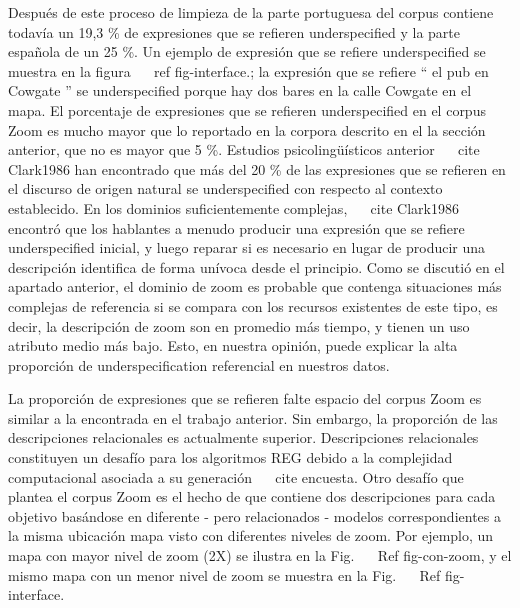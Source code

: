 Despu\'es de este proceso de limpieza de la parte portuguesa del corpus contiene todav\'{i}a un 19,3 \% de expresiones que se refieren underspecified y la parte espa\~nola de un 25 \%. Un ejemplo de expresi\'on que se refiere underspecified se muestra en la figura ~ \ ref {fig-interface}.; la expresi\'on que se refiere `` el pub en Cowgate '' se underspecified porque hay dos bares en la calle Cowgate en el mapa. El porcentaje de expresiones que se refieren underspecified en el corpus Zoom es mucho mayor que lo reportado en la corpora descrito en el la secci\'on anterior, que no es mayor que 5 \%. Estudios psicoling\"u\'{i}sticos anterior ~ \ cite {} Clark1986 han encontrado que m\'as del 20 \% de las expresiones que se refieren en el discurso de origen natural se underspecified con respecto al contexto establecido. En los dominios suficientemente complejas, ~ \ cite {} Clark1986 encontr\'o que los hablantes a menudo producir una expresi\'on que se refiere underspecified inicial, y luego reparar si es necesario en lugar de producir una descripci\'on identifica de forma un\'{i}voca desde el principio. Como se discuti\'o en
el apartado anterior, el dominio de zoom es probable que contenga situaciones m\'as complejas de referencia si se compara con los recursos existentes de este tipo, es decir, la descripci\'on de zoom son en promedio m\'as tiempo, y tienen un uso atributo medio m\'as bajo. Esto, en nuestra opini\'on, puede explicar la alta proporci\'on de underspecification referencial en nuestros datos.

La proporci\'on de expresiones que se refieren falte espacio del corpus Zoom es similar a la encontrada en el trabajo anterior. Sin embargo, la proporci\'on de las descripciones relacionales es actualmente superior. Descripciones relacionales constituyen un desaf\'{i}o para los algoritmos REG debido a la complejidad computacional asociada a su generaci\'on ~ \ cite {} encuesta. Otro desaf\'{i}o que plantea el corpus Zoom es el hecho de que contiene dos descripciones para cada objetivo bas\'andose en diferente - pero relacionados - modelos correspondientes a la misma ubicaci\'on mapa visto con diferentes niveles de zoom. Por ejemplo, un mapa con mayor nivel de zoom (2X) se ilustra en la Fig. ~ \ Ref {fig-con-zoom}, y el mismo mapa con un menor nivel de zoom se muestra en la Fig. ~ \ Ref {fig-interface}.

